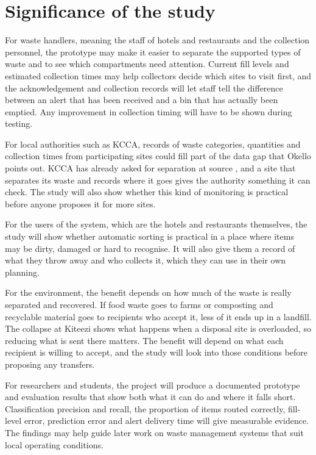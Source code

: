 \section{Significance of the study}

For waste handlers, meaning the staff of hotels and restaurants and the collection personnel, the prototype may make it easier to separate the supported types of waste and to see which compartments need attention. Current fill levels and estimated collection times may help collectors decide which sites to visit first, and the acknowledgement and collection records will let staff tell the difference between an alert that has been received and a bin that has actually been emptied. Any improvement in collection timing will have to be shown during testing.

For local authorities such as KCCA, records of waste categories, quantities and collection times from participating sites could fill part of the data gap that Okello \cite{okello} points out. KCCA has already asked for separation at source \cite{kccand}, and a site that separates its waste and records where it goes gives the authority something it can check. The study will also show whether this kind of monitoring is practical before anyone proposes it for more sites.

For the users of the system, which are the hotels and restaurants themselves, the study will show whether automatic sorting is practical in a place where items may be dirty, damaged or hard to recognise. It will also give them a record of what they throw away and who collects it, which they can use in their own planning.

For the environment, the benefit depends on how much of the waste is really separated and recovered. If food waste goes to farms or composting and recyclable material goes to recipients who accept it, less of it ends up in a landfill. The collapse at Kiteezi shows what happens when a disposal site is overloaded, so reducing what is sent there matters. The benefit will depend on what each recipient is willing to accept, and the study will look into those conditions before proposing any transfers.

For researchers and students, the project will produce a documented prototype and evaluation results that show both what it can do and where it falls short. Classification precision and recall, the proportion of items routed correctly, fill-level error, prediction error and alert delivery time will give measurable evidence. The findings may help guide later work on waste management systems that suit local operating conditions.

